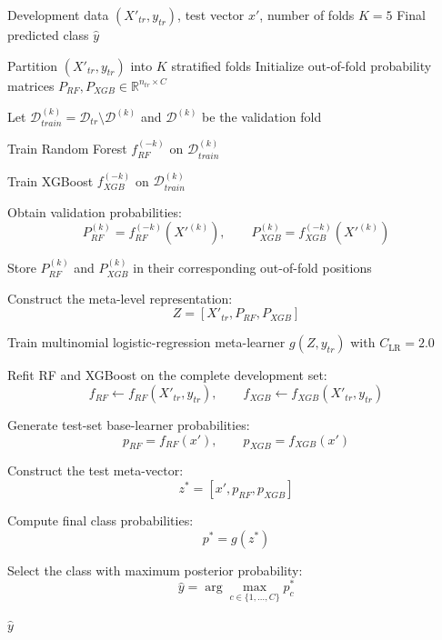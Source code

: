 \documentclass{elektr}
\begin{document}
\begin{algorithm}[H]
\caption{Out-of-Fold RF--XGBoost Stacking}
\label{alg:stack}
\small
\begin{algorithmic}[1]

\Require Development data $(X'_{tr},y_{tr})$, test vector $x'$, 
number of folds $K=5$
\Ensure Final predicted class $\hat{y}$

\State Partition $(X'_{tr},y_{tr})$ into $K$ stratified folds
\State Initialize out-of-fold probability matrices
$P_{RF},P_{XGB}\in\mathbb{R}^{n_{tr}\times C}$


    \State Let $\mathcal{D}_{train}^{(k)}
    =\mathcal{D}_{tr}\setminus\mathcal{D}^{(k)}$
    and $\mathcal{D}^{(k)}$ be the validation fold

    \State Train Random Forest $f_{RF}^{(-k)}$
    on $\mathcal{D}_{train}^{(k)}$

    \State Train XGBoost $f_{XGB}^{(-k)}$
    on $\mathcal{D}_{train}^{(k)}$

    \State Obtain validation probabilities:
    \[
    P_{RF}^{(k)}
    =f_{RF}^{(-k)}(X'^{(k)}),\qquad
    P_{XGB}^{(k)}
    =f_{XGB}^{(-k)}(X'^{(k)})
    \]

    \State Store $P_{RF}^{(k)}$ and $P_{XGB}^{(k)}$
    in their corresponding out-of-fold positions

\EndFor

\State Construct the meta-level representation:
\[
Z=
\left[
X'_{tr},P_{RF},P_{XGB}
\right]
\]

\State Train multinomial logistic-regression meta-learner
$g(Z,y_{tr})$ with $C_{\mathrm{LR}}=2.0$

\State Refit RF and XGBoost on the complete development set:
\[
f_{RF}\leftarrow f_{RF}(X'_{tr},y_{tr}),
\qquad
f_{XGB}\leftarrow f_{XGB}(X'_{tr},y_{tr})
\]

\State Generate test-set base-learner probabilities:
\[
p_{RF}=f_{RF}(x'),\qquad
p_{XGB}=f_{XGB}(x')
\]

\State Construct the test meta-vector:
\[
z^*=[x',p_{RF},p_{XGB}]
\]

\State Compute final class probabilities:
\[
p^*=g(z^*)
\]

\State Select the class with maximum posterior probability:
\[
\hat{y}=\arg\max_{c\in\{1,\ldots,C\}}p_c^*
\]

\State \Return $\hat{y}$

\end{algorithmic}
\end{algorithm}
\end{document}
